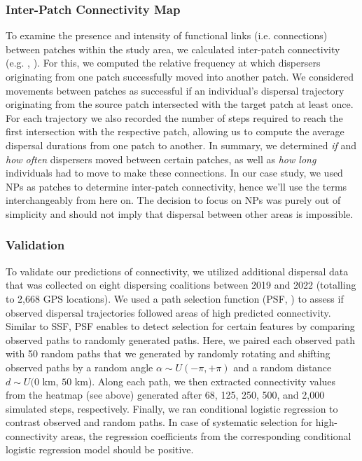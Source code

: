 \documentclass[../FinalThesis.tex]{subfiles}
\begin{document}
\subsubsection{Inter-Patch Connectivity Map}

To examine the presence and intensity of functional links (i.e. connections)
between patches within the study area, we calculated inter-patch connectivity
(e.g. \citealp{Gustafson.1996}, \citealp{Kanagaraj.2013}). For this, we computed
the relative frequency at which dispersers originating from one patch
successfully moved into another patch. We considered movements between patches
as successful if an individual's dispersal trajectory originating from the
source patch intersected with the target patch at least once. For each
trajectory we also recorded the number of steps required to reach the first
intersection with the respective patch, allowing us to compute the average
dispersal durations from one patch to another. In summary, we determined
\textit{if} and \textit{how often} dispersers moved between certain patches, as
well as \textit{how long} individuals had to move to make these connections. In
our case study, we used NPs as patches to determine inter-patch connectivity,
hence we'll use the terms interchangeably from here on. The decision to focus on
NPs was purely out of simplicity and should not imply that dispersal between
other areas is impossible.

\subsubsection{Validation}

To validate our predictions of connectivity, we utilized additional dispersal
data that was collected on eight dispersing coalitions between 2019 and 2022
(totalling to 2,668 GPS locations). We used a path selection function (PSF,
\citealp{Cushman.2010}) to assess if observed dispersal trajectories followed
areas of high predicted connectivity. Similar to SSF, PSF enables to detect
selection for certain features by comparing observed paths to randomly generated
paths. Here, we paired each observed path with 50 random paths that we generated
by randomly rotating and shifting observed paths by a random angle \(\alpha \sim
U(-\pi, +\pi)\) and a random distance \(d \sim U(0 \) km, \(50\) km\(\)). Along
each path, we then extracted connectivity values from the heatmap (see above)
generated after 68, 125, 250, 500, and 2,000 simulated steps, respectively.
Finally, we ran conditional logistic regression to contrast observed and random
paths. In case of systematic selection for high-connectivity areas, the
regression coefficients from the corresponding conditional logistic regression
model should be positive.
\end{document}
